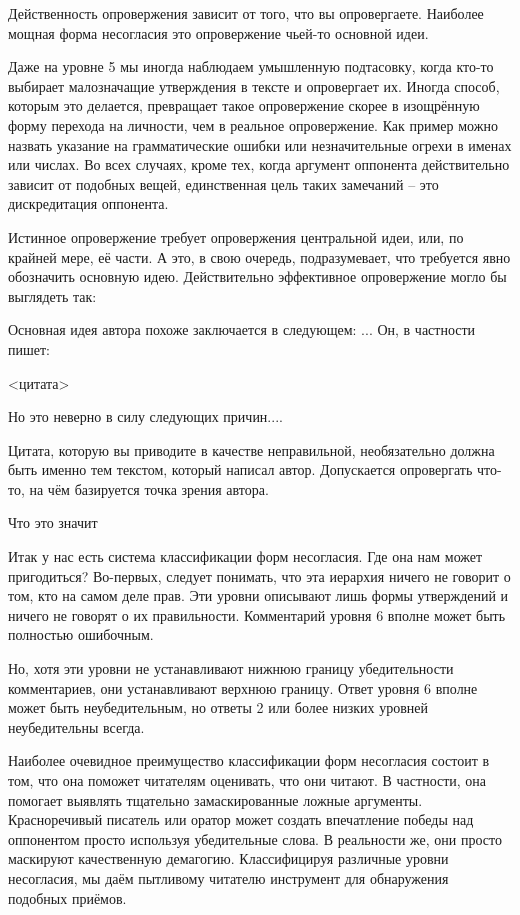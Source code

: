 \documentclass[ebook,12pt,oneside,openany]{memoir}
\begin{document}
Действенность опровержения зависит от того, что вы опровергаете.
Наиболее мощная форма несогласия это опровержение чьей-то основной
идеи.

Даже на уровне 5 мы иногда наблюдаем умышленную подтасовку, когда
кто-то выбирает малозначащие утверждения в тексте и опровергает их.
Иногда способ, которым это делается, превращает такое опровержение
скорее в изощрённую форму перехода на личности, чем в реальное
опровержение. Как пример можно назвать указание на грамматические
ошибки или незначительные огрехи в именах или числах. Во всех случаях,
кроме тех, когда аргумент оппонента действительно зависит от подобных
вещей, единственная цель таких замечаний -- это дискредитация
оппонента.

Истинное опровержение требует опровержения центральной идеи, или, по
крайней мере, её части. А это, в свою очередь, подразумевает, что
требуется явно обозначить основную идею. Действительно эффективное
опровержение могло бы выглядеть так:

Основная идея автора похоже заключается в следующем: ... Он, в
частности пишет:

<цитата>

Но это неверно в силу следующих причин....

Цитата, которую вы приводите в качестве неправильной, необязательно
должна быть именно тем текстом, который написал автор. Допускается
опровергать что-то, на чём базируется точка зрения автора.

Что это значит

Итак у нас есть система классификации форм несогласия. Где она нам
может пригодиться? Во-первых, следует понимать, что эта иерархия
ничего не говорит о том, кто на самом деле прав. Эти уровни описывают
лишь формы утверждений и ничего не говорят о их правильности.
Комментарий уровня 6 вполне может быть полностью ошибочным.

Но, хотя эти уровни не устанавливают нижнюю границу убедительности
комментариев, они устанавливают верхнюю границу. Ответ уровня 6 вполне
может быть неубедительным, но ответы 2 или более низких уровней
неубедительны всегда.

Наиболее очевидное преимущество классификации форм несогласия состоит
в том, что она поможет читателям оценивать, что они читают. В
частности, она помогает выявлять тщательно замаскированные ложные
аргументы. Красноречивый писатель или оратор может создать впечатление
победы над оппонентом просто используя убедительные слова. В
реальности же, они просто маскируют качественную демагогию.
Классифицируя различные уровни несогласия, мы даём пытливому читателю
инструмент для обнаружения подобных приёмов.
\end{document}
